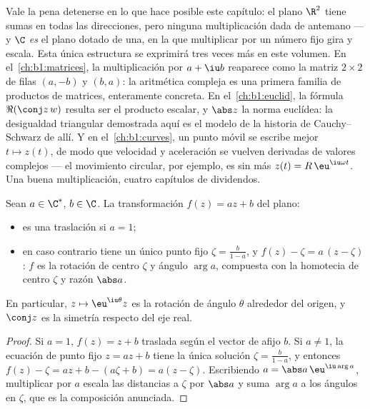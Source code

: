 \begin{remark}\label{rem:b1:complex:interlude}
Vale la pena detenerse en lo que hace posible este capítulo: el plano
$\R^2$ tiene sumas en todas las direcciones, pero ninguna
multiplicación dada de antemano --- y $\C$ \emph{es} el plano dotado de
una, en la que multiplicar por un número fijo gira y escala. Esta única
estructura se exprimirá tres veces más en este volumen. En
el~\cref{ch:b1:matrices}, la multiplicación por $a + \iu b$ reaparece
como la matriz $2 \times 2$ de filas $(a, -b)$ y $(b, a)$: la
aritmética compleja es una primera familia de productos de matrices,
enteramente concreta. En el~\cref{ch:b1:euclid}, la fórmula
$\Re(\conj z\,w)$ resulta ser el producto escalar, y $\abs z$ la norma
euclídea: la desigualdad triangular demostrada aquí es el modelo de la
historia de Cauchy--Schwarz de allí. Y en el~\cref{ch:b1:curves}, un
punto móvil se escribe mejor $t \mapsto z(t)$, de modo que velocidad y
aceleración se vuelven derivadas de valores complejos --- el movimiento
circular, por ejemplo, es sin más $z(t) = R\,\eu^{\iu\omega t}$. Una
buena multiplicación, cuatro capítulos de dividendos.
\end{remark}

\begin{proposition}\label{prop:b1:complex:similitude}
Sean $a \in \C^*$, $b \in \C$. La transformación $f(z) = az + b$ del
plano:
\begin{itemize}
  \item es una traslación si $a = 1$;
  \item en caso contrario tiene un único punto fijo
        $\zeta = \frac{b}{1-a}$, y $f(z) - \zeta = a\,(z - \zeta)$: $f$
        es la rotación de centro $\zeta$ y ángulo $\arg a$, compuesta
        con la homotecia de centro $\zeta$ y razón $\abs a$.
\end{itemize}
En particular, $z \mapsto \eu^{\iu\theta} z$ es la rotación de ángulo
$\theta$ alrededor del origen, y $\conj z$ es la simetría respecto del
eje real.
\end{proposition}

\begin{proof}
Si $a = 1$, $f(z) = z + b$ traslada según el vector de afijo $b$. Si
$a \neq 1$, la ecuación de punto fijo $z = az + b$ tiene la única
solución $\zeta = \frac{b}{1-a}$, y entonces $f(z) - \zeta = az + b -
(a\zeta + b) = a(z - \zeta)$. Escribiendo $a = \abs a\, \eu^{\iu\arg a}$,
multiplicar por $a$ escala las distancias a $\zeta$ por $\abs a$ y suma
$\arg a$ a los ángulos en $\zeta$, que es la composición anunciada.
\end{proof}

